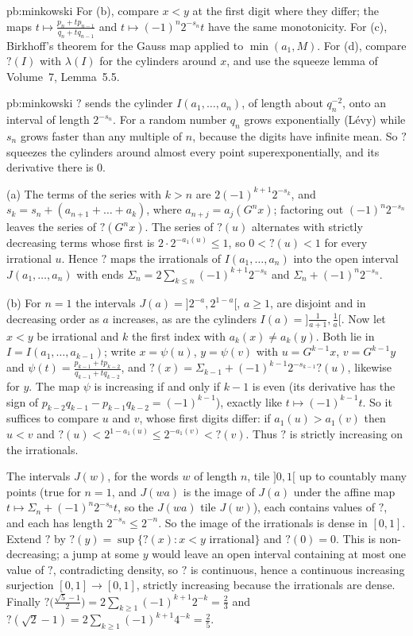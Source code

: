 \begin{hint}{pb:minkowski}
For (b), compare $x<y$ at the first digit where they differ; the maps $t\mapsto\frac{p_n+tp_{n-1}}{q_n+tq_{n-1}}$ and $t\mapsto(-1)^n2^{-s_n}t$ have the same
monotonicity. For (c), Birkhoff's theorem for the Gauss map applied to $\min(a_1,M)$. For (d), compare $?(I)$ with $\lambda(I)$ for the cylinders around
$x$, and use the squeeze lemma of Volume~7, Lemma~5.5.
\end{hint}

\begin{solution}{pb:minkowski}
\idea $?$ sends the cylinder $I(a_1,\dots,a_n)$, of length about $q_n^{-2}$, onto an interval of length $2^{-s_n}$. For a random number $q_n$ grows exponentially
(Lévy) while $s_n$ grows faster than any multiple of $n$, because the digits have infinite mean. So $?$ squeezes the cylinders around almost every point
superexponentially, and its derivative there is $0$.

\writeup (a) The terms of the series with $k>n$ are $2(-1)^{k+1}2^{-s_k}$, and $s_k=s_n+(a_{n+1}+\dots+a_k)$, where $a_{n+j}=a_j(G^nx)$; factoring out
$(-1)^n2^{-s_n}$ leaves the series of $?(G^nx)$. The series of $?(u)$ alternates with strictly decreasing terms whose first is $2\cdot2^{-a_1(u)}\le1$, so
$0<?(u)<1$ for every irrational $u$. Hence $?$ maps the irrationals of $I(a_1,\dots,a_n)$ into the open interval $J(a_1,\dots,a_n)$ with ends
$\Sigma_n=2\sum_{k\le n}(-1)^{k+1}2^{-s_k}$ and $\Sigma_n+(-1)^n2^{-s_n}$.

(b) For $n=1$ the intervals $J(a)=]2^{-a},2^{1-a}[$, $a\ge1$, are disjoint and in decreasing order as $a$ increases, as are the cylinders $I(a)=]\frac1{a+1},\frac1a[$.
Now let $x<y$ be irrational and $k$ the first index with $a_k(x)\ne a_k(y)$. Both lie in $I=I(a_1,\dots,a_{k-1})$; write $x=\psi(u)$, $y=\psi(v)$ with $u=G^{k-1}x$,
$v=G^{k-1}y$ and $\psi(t)=\frac{p_{k-1}+tp_{k-2}}{q_{k-1}+tq_{k-2}}$, and $?(x)=\Sigma_{k-1}+(-1)^{k-1}2^{-s_{k-1}}?(u)$, likewise for $y$. The map $\psi$ is increasing
if and only if $k-1$ is even (its derivative has the sign of $p_{k-2}q_{k-1}-p_{k-1}q_{k-2}=(-1)^{k-1}$), exactly like $t\mapsto(-1)^{k-1}t$. So it suffices to compare
$u$ and $v$, whose first digits differ: if $a_1(u)>a_1(v)$ then $u<v$ and $?(u)<2^{1-a_1(u)}\le2^{-a_1(v)}<?(v)$. Thus $?$ is strictly increasing on the irrationals.

The intervals $J(w)$, for the words $w$ of length $n$, tile $]0,1[$ up to countably many points (true for $n=1$, and $J(wa)$ is the image of $J(a)$ under the affine map
$t\mapsto\Sigma_n+(-1)^n2^{-s_n}t$, so the $J(wa)$ tile $J(w)$), each contains values of $?$, and each has length $2^{-s_n}\le2^{-n}$. So the image of the irrationals is
dense in $[0,1]$. Extend $?$ by $?(y)=\sup\{?(x):x<y\text{ irrational}\}$ and $?(0)=0$. This is non-decreasing; a jump at some $y$ would leave an open interval containing at
most one value of $?$, contradicting density, so $?$ is continuous, hence a continuous increasing surjection $[0,1]\to[0,1]$, strictly increasing because the
irrationals are dense. Finally $?\bigl(\frac{\sqrt5-1}2\bigr)=2\sum_{k\ge1}(-1)^{k+1}2^{-k}=\frac23$ and $?(\sqrt2-1)=2\sum_{k\ge1}(-1)^{k+1}4^{-k}=\frac25$.


\end{solution}
